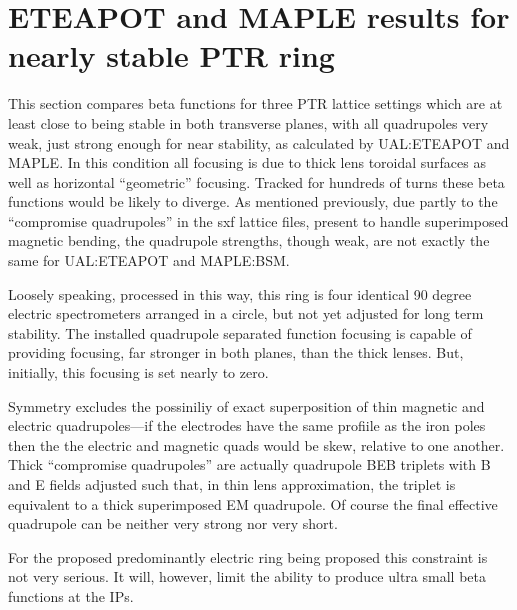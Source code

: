 \documentclass[]{article}
\begin{document}
\clearpage

\section{ETEAPOT and MAPLE results for nearly stable PTR ring} 
This section compares beta functions for three PTR lattice settings which
are at least close to being stable in both transverse planes, with all 
quadrupoles very weak, just strong enough for near stability,
as calculated by UAL:ETEAPOT and MAPLE.  In this condition all focusing
is due to thick lens toroidal surfaces as well as horizontal ``geometric''
focusing.  Tracked for hundreds of turns these beta functions would be likely
to diverge.  As mentioned previously,  due partly to the ``compromise quadrupoles''  
in the sxf lattice files, present to handle superimposed magnetic bending,
the quadrupole strengths, though weak, are not exactly the same for UAL:ETEAPOT 
and MAPLE:BSM.  

Loosely speaking, processed in this way, this ring is four identical 90 degree
electric spectrometers arranged in a circle, but not yet adjusted for long term 
stability.  The installed quadrupole separated function focusing is capable of
providing focusing, far stronger in both planes, than the thick lenses.  But, initially,
this focusing is set nearly to zero.

Symmetry excludes  the possiniliy of exact superposition of thin magnetic and electric 
quadrupoles---if the electrodes have the same profiile as the iron poles then the
the electric and magnetic quads would be skew, relative to one another. 
Thick ``compromise quadrupoles'' are actually quadrupole BEB triplets with B and E fields
adjusted such that, in thin lens approximation, the triplet is equivalent to a thick superimposed 
EM quadrupole.   Of course the final effective quadrupole can be neither very strong nor 
very short.

For the proposed predominantly electric ring being proposed this constraint is not very 
serious.  It will, however, limit the ability to produce ultra small beta functions at the IPs.  
\end{document}
